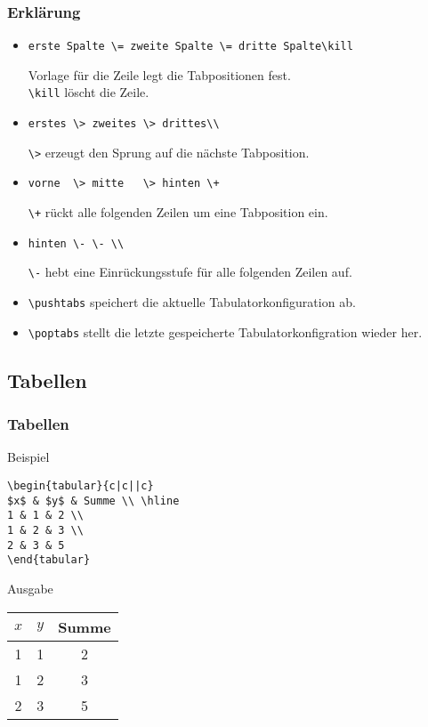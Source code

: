 \begin{frame}[c,fragile]
\frametitle{Erkl\"arung}

\begin{itemize}
\item \begin{block}{}\verb|erste Spalte \= zweite Spalte \= dritte Spalte\kill|\end{block} 
Vorlage f\"ur die Zeile \lc{=} legt die Tabpositionen fest. \\
\verb|\kill| l\"oscht die Zeile.
\item \begin{block}{}\verb|erstes \> zweites \> drittes\\|\end{block}
\verb|\>| erzeugt den Sprung auf die n\"achste Tabposition.
\item \begin{block}{}\verb|vorne  \> mitte   \> hinten \+|\end{block}
\verb|\+| r\"uckt alle folgenden Zeilen um eine Tabposition ein.
\item \begin{block}{}\verb|hinten \- \- \\|\end{block}
\verb|\-| hebt eine Einr\"uckungsstufe f\"ur alle folgenden Zeilen auf.
\item \verb|\pushtabs| speichert die aktuelle Tabulatorkonfiguration ab.
\item \verb|\poptabs| stellt die letzte gespeicherte Tabulatorkonfigration wieder her.
\end{itemize}

\end{frame}

\subsection{Tabellen}

\begin{frame}[c,fragile]
\frametitle{Tabellen}

\begin{block}{Beispiel}
\begin{verbatim}
\begin{tabular}{c|c||c}
$x$ & $y$ & Summe \\ \hline
1 & 1 & 2 \\
1 & 2 & 3 \\
2 & 3 & 5 
\end{tabular}
\end{verbatim}
\end{block}

\begin{block}{Ausgabe}
\begin{tabular}{c|c||c}
$x$ & $y$ & Summe \\ \hline
1 & 1 & 2 \\
1 & 2 & 3 \\
2 & 3 & 5 
\end{tabular}
\end{block}

\end{frame}

